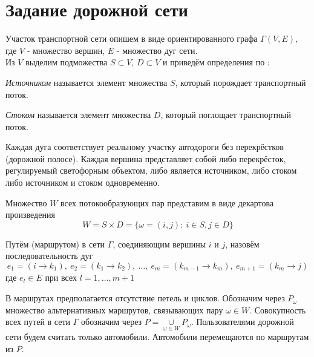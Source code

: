 \section{Задание дорожной сети}
Участок транспортной сети опишем в виде ориентированного графа $\Gamma(V,E)$, где $V$ - множество вершин, $E$ - множество дуг сети.\\
Из $V$ выделим подможества $S\subset V$, $D\subset V$ и приведём определения по \cite{book-Gasnikov}:
\begin{m-definition}
	\textit{Источником} называется элемент множества $S$, который порождает транспортный поток.
\end{m-definition}

\begin{m-definition}
	\textit{Стоком} называется элемент множества $D$, который поглощает транспортный поток.
\end{m-definition}
Каждая дуга соответствует реальному участку автодороги без перекрёстков\\
(дорожной полосе). Каждая вершина представляет собой либо перекрёсток, регулируемый светофорным объектом, либо является источником, либо стоком либо источником и стоком одновременно.
\begin{m-definition} \cite{book-Gasnikov}
	Множество $W$ всех потокообразующих пар представим в виде декартова произведения 
	\begin{equation}
		W = S \times D = \{\omega = (i, j): \ i \in S, j \in D\}
	\end{equation}
\end{m-definition}
\begin{m-definition} \cite{book-Gasnikov}
	Путём (маршрутом) в сети $\Gamma$, соединяющим вершины $i$ и $j$, назовём последовательность дуг
	\begin{equation}
		e_1 = (i\rightarrow k_1), \ e_2 = (k_1 \rightarrow k_2), \ \ldots, \ e_m = (k_{m-1} \rightarrow k_m), \  e_{m+1} = (k_m \rightarrow j)
	\end{equation}
	где $e_l \in E$ при всех $l = 1,\ldots, m+1$
	
\end{m-definition}
В маршрутах предполагается отсутствие петель и циклов.
Обозначим через $P_{\omega}$ \cite{book-Gasnikov} множество альтернативных маршрутов, связывающих пару $\omega \in W$.
Совокупность всех путей в сети $\Gamma$ обозначим через $P = \underset{\omega \in W}{\cup}P_{\omega}$.
Пользователями дорожной сети будем считать только автомобили.
Автомобили перемещаются по маршрутам из $P$.

